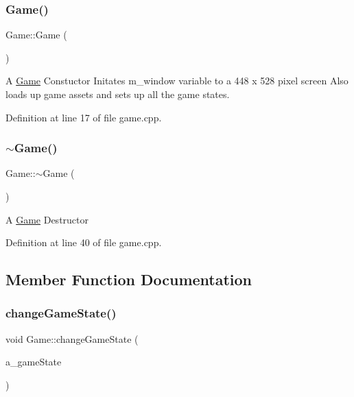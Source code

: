 \subsubsection{\texorpdfstring{Game()}{Game()}}
{\footnotesize\ttfamily Game\+::\+Game (\begin{DoxyParamCaption}{ }\end{DoxyParamCaption})}

A \hyperlink{class_game}{Game} Constuctor Initates m\+\_\+window variable to a 448 x 528 pixel screen Also loads up game assets and sets up all the game states. 

Definition at line 17 of file game.\+cpp.

\mbox{\label{class_game_ae3d112ca6e0e55150d2fdbc704474530}} 
\subsubsection{\texorpdfstring{$\sim$\+Game()}{~Game()}}
{\footnotesize\ttfamily Game\+::$\sim$\+Game (\begin{DoxyParamCaption}{ }\end{DoxyParamCaption})}

A \hyperlink{class_game}{Game} Destructor 

Definition at line 40 of file game.\+cpp.



\subsection{Member Function Documentation}
\mbox{\label{class_game_aead31c173174cd4251542403a9e1e111}} 
\subsubsection{\texorpdfstring{change\+Game\+State()}{changeGameState()}}
{\footnotesize\ttfamily void Game\+::change\+Game\+State (\begin{DoxyParamCaption}\item[{\hyperlink{class_game_state_a81618e0403319d48e9f25347111f8157}{Game\+State\+::\+State}}]{a\+\_\+game\+State }\end{DoxyParamCaption})}

